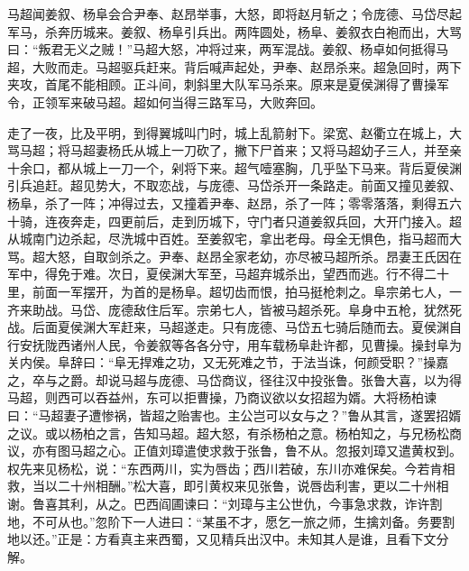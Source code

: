马超闻姜叙、杨阜会合尹奉、赵昂举事，大怒，即将赵月斩之；令庞德、马岱尽起军马，杀奔历城来。姜叙、杨阜引兵出。两阵圆处，杨阜、姜叙衣白袍而出，大骂曰：“叛君无义之贼！”马超大怒，冲将过来，两军混战。姜叙、杨卓如何抵得马超，大败而走。马超驱兵赶来。背后喊声起处，尹奉、赵昂杀来。超急回时，两下夹攻，首尾不能相顾。正斗间，刺斜里大队军马杀来。原来是夏侯渊得了曹操军令，正领军来破马超。超如何当得三路军马，大败奔回。

走了一夜，比及平明，到得翼城叫门时，城上乱箭射下。梁宽、赵衢立在城上，大骂马超；将马超妻杨氏从城上一刀砍了，撇下尸首来；又将马超幼子三人，并至亲十余口，都从城上一刀一个，剁将下来。超气噎塞胸，几乎坠下马来。背后夏侯渊引兵追赶。超见势大，不取恋战，与庞德、马岱杀开一条路走。前面又撞见姜叙、杨阜，杀了一阵；冲得过去，又撞着尹奉、赵昂，杀了一阵；零零落落，剩得五六十骑，连夜奔走，四更前后，走到历城下，守门者只道姜叙兵回，大开门接入。超从城南门边杀起，尽洗城中百姓。至姜叙宅，拿出老母。母全无惧色，指马超而大骂。超大怒，自取剑杀之。尹奉、赵昂全家老幼，亦尽被马超所杀。昂妻王氏因在军中，得免于难。次日，夏侯渊大军至，马超弃城杀出，望西而逃。行不得二十里，前面一军摆开，为首的是杨阜。超切齿而恨，拍马挺枪刺之。阜宗弟七人，一齐来助战。马岱、庞德敌住后军。宗弟七人，皆被马超杀死。阜身中五枪，犹然死战。后面夏侯渊大军赶来，马超遂走。只有庞德、马岱五七骑后随而去。夏侯渊自行安抚陇西诸州人民，令姜叙等各各分守，用车载杨阜赴许都，见曹操。操封阜为关内侯。阜辞曰：“阜无捍难之功，又无死难之节，于法当诛，何颜受职？”操嘉之，卒与之爵。却说马超与庞德、马岱商议，径往汉中投张鲁。张鲁大喜，以为得马超，则西可以吞益州，东可以拒曹操，乃商议欲以女招超为婿。大将杨柏谏曰：“马超妻子遭惨祸，皆超之贻害也。主公岂可以女与之？”鲁从其言，遂罢招婿之议。或以杨柏之言，告知马超。超大怒，有杀杨柏之意。杨柏知之，与兄杨松商议，亦有图马超之心。正值刘璋遣使求救于张鲁，鲁不从。忽报刘璋又遣黄权到。权先来见杨松，说：“东西两川，实为唇齿；西川若破，东川亦难保矣。今若肯相救，当以二十州相酬。”松大喜，即引黄权来见张鲁，说唇齿利害，更以二十州相谢。鲁喜其利，从之。巴西阎圃谏曰：“刘璋与主公世仇，今事急求救，诈许割地，不可从也。”忽阶下一人进曰：“某虽不才，愿乞一旅之师，生擒刘备。务要割地以还。”正是：方看真主来西蜀，又见精兵出汉中。未知其人是谁，且看下文分解。
